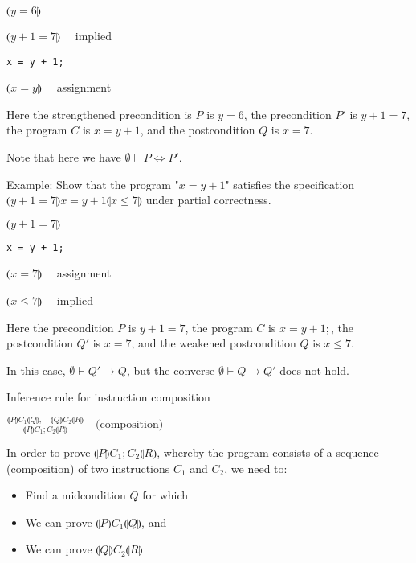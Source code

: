 \documentclass{article}
\begin{document}
$\llparenthesis y=6 \rrparenthesis$

$\llparenthesis y+ 1 = 7 \rrparenthesis \quad$ implied

\begin{verbatim}
x = y + 1;
\end{verbatim}

$\llparenthesis x = y \rrparenthesis \quad$ assignment

Here the strengthened precondition is $P$ is $y = 6$, the precondition $P'$ is $y + 1 = 7$, the program $C$ is $x = y + 1$, and the postcondition $Q$ is $x = 7$.

Note that here we have $\emptyset \vdash P \iff P'$.

Example: Show that the program "$x = y + 1$" satisfies the specification $\llparenthesis y + 1 = 7 \rrparenthesis x = y + 1 \llparenthesis x \le 7 \rrparenthesis$ under partial correctness.

$\llparenthesis y + 1 = 7 \rrparenthesis$ 

\begin{verbatim}
x = y + 1;
\end{verbatim}

$\llparenthesis x = 7 \rrparenthesis \quad$ assignment

$\llparenthesis x \le 7 \rrparenthesis \quad$ implied

Here the precondition $P$ is $y + 1 = 7$, the program $C$ is $x = y + 1;$, the postcondition $Q'$ is $x = 7$, and the weakened postcondition $Q$ is $x \le 7$.

In this case, $\emptyset \vdash Q' \rightarrow Q$, but the converse $\emptyset \vdash Q \rightarrow Q'$ does not hold.


Inference rule for instruction composition

$\frac{\llparenthesis P \rrparenthesis C_1 \llparenthesis Q \rrparenthesis, \quad \llparenthesis Q \rrparenthesis C_2 \llparenthesis R \rrparenthesis}{\llparenthesis P \rrparenthesis C_1; C_2 \llparenthesis R \rrparenthesis} \quad \text{(composition)}$

In order to prove $\llparenthesis P \rrparenthesis C_1; C_2 \llparenthesis R \rrparenthesis$, whereby the program consists of a sequence (composition) of two instructions $C_1$ and $C_2$, we need to:
\begin{itemize}
    \item Find a midcondition $Q$ for which
    \item We can prove $\llparenthesis P \rrparenthesis C_1 \llparenthesis Q \rrparenthesis$, and
    \item We can prove $\llparenthesis Q \rrparenthesis C_2 \llparenthesis R \rrparenthesis$
\end{itemize}
\end{document}
